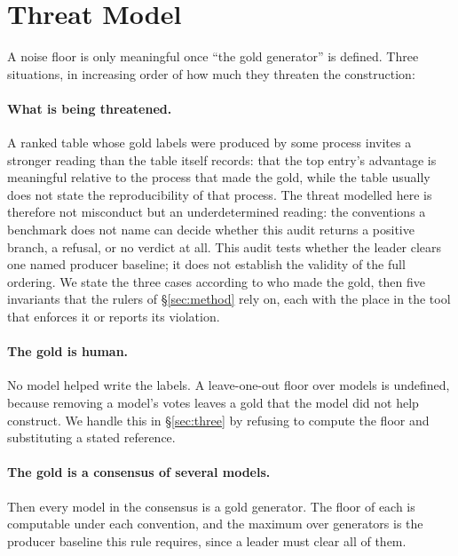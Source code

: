 \documentclass{article}
\begin{document}
\section{Threat Model}
\label{sec:threat} A noise floor is only meaningful once ``the gold generator'' is defined. Three situations, in increasing order of how much they threaten the construction:

\paragraph{What is being threatened.} A ranked table whose gold labels were produced by some process invites a stronger reading than the table itself records: that the top entry's advantage is meaningful relative to the process that made the gold, while the table usually does not state the reproducibility of that process. The threat modelled here is therefore not misconduct but an underdetermined reading: the conventions a benchmark does not name can decide whether this audit returns a positive branch, a refusal, or no verdict at all. This audit tests whether the leader clears one named producer baseline; it does not establish the validity of the full ordering. We state the three cases according to who made the gold, then five invariants that the rulers of \S\ref{sec:method} rely on, each with the place in the tool that enforces it or reports its violation.
\paragraph{The gold is human.} No model helped write the labels. A leave-one-out floor over models is undefined, because removing a model's votes leaves a gold that the model did not help construct. We handle this in \S\ref{sec:three} by refusing to compute the floor and substituting a stated reference.
\paragraph{The gold is a consensus of several models.} Then every model in the consensus is a gold generator. The floor of each is computable under each convention, and the maximum over generators is the producer baseline this rule requires, since a leader must clear all of them.
\end{document}
